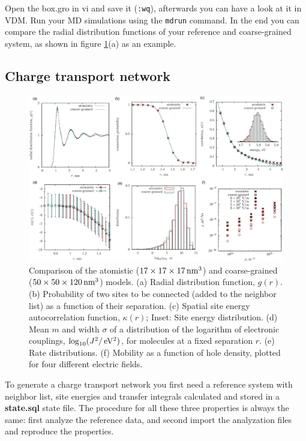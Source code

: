 Open the box.gro in vi and save it (\texttt{:wq}), afterwards you can have a look at it in VDM. Run your MD simulations using the \texttt{mdrun} command. In the end you can compare the radial distribution functions of your reference and coarse-grained system, as shown in figure \ref{fig:stochastic}(a) as an example.

\subsection{Charge transport network}

\begin{figure}[ht]
\includegraphics[width=1.0\textwidth]{fig/stochastic/stochastic}
\caption{ Comparison of the atomistic ($\unit[17\times17\times17]{nm^3}$) and coarse-grained ($\unit[50\times 50\times120]{nm^3}$) models. (a) Radial distribution function, $g(r)$. (b) Probability of two sites to be connected (added to the neighbor list) as a function of their separation. (c) Spatial site energy autocorrelation function, $\kappa(r)$; Inset:  Site energy distribution. (d) Mean $m$ and width $\sigma$ of a distribution of the logarithm of electronic couplings, $\log_{10}(\unit[J^2/]{eV^2})$, for molecules at a fixed separation $r$. (e) Rate distributions. (f) Mobility as a function of hole density, plotted for four different electric fields.}
\label{fig:stochastic}
\end{figure}

To generate a charge transport network you first need a reference system with neighbor list, site energies and transfer integrals calculated and stored in a \textbf{state.sql} state file. The procedure for all these three properties is always the same: first analyze the reference data, and second import the analyzation files and reproduce the properties.




